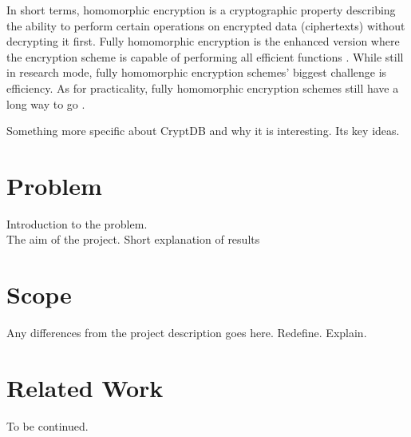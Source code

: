In short terms, homomorphic encryption is a cryptographic property describing the ability to perform certain operations on encrypted data (ciphertexts) without decrypting it first. Fully homomorphic encryption is the enhanced version where the encryption scheme is capable of performing all efficient functions \cite{Gentry_thesis}. While still in research mode, fully homomorphic encryption schemes' biggest challenge is efficiency. As for practicality, fully homomorphic encryption schemes still have a long way to go \cite{naehrig2011can}.

Something more specific about CryptDB and why it is interesting. Its key ideas.

\section{Problem}

Introduction to the problem.\\
The aim of the project.
Short explanation of results

\section{Scope}

Any differences from the project description goes here. Redefine. Explain.

\section{Related Work}

To be continued. 